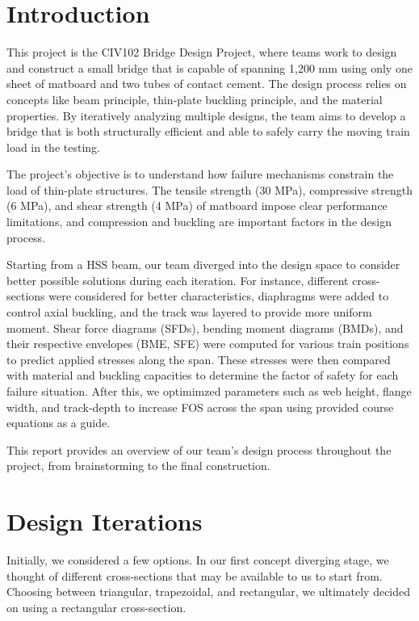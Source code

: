 \documentclass[prl,twocolumn,secnumarabic, amsmath,amssymb,superscriptaddress]{revtex4-2}
\begin{document}
\newpage
\twocolumngrid

\section{Introduction}
This project is the CIV102  Bridge Design Project, where teams work to design and construct a small bridge that is capable of spanning 1,200 mm using only one sheet of matboard and two tubes of contact cement. The design process relies on concepts like beam principle, thin-plate buckling principle, and the material properties. By iteratively analyzing multiple designs, the team aims to develop a bridge that is both structurally efficient and able to safely carry the moving train load in the testing.

The project's objective is to understand how failure mechanisms constrain the load of thin-plate structures. The tensile strength (30 MPa), compressive strength (6 MPa), and shear strength (4 MPa) of matboard impose clear performance limitations, and compression and buckling are important factors in the design process.

Starting from a HSS beam, our team diverged into the design space to consider better possible solutions during each iteration. For instance, different cross-sections were considered for better characteristics, diaphragms were added to control axial buckling, and the track was layered to provide more uniform moment. Shear force diagrams (SFDs), bending moment diagrams (BMDs), and their respective envelopes (BME, SFE) were computed for various train positions to predict applied stresses along the span. These stresses were then compared with material and buckling capacities to determine the factor of safety for each failure situation. After this, we optimimzed parameters such as web height, flange width, and track-depth to increase FOS across the span using provided course equations as a guide.

This report provides an overview of our team's design process throughout the project, from brainstorming to the final construction.


\section{Design Iterations}
Initially, we considered a few options. In our first concept diverging stage, we thought of different cross-sections that may be available to us to
start from. Choosing between triangular, trapezoidal, and rectangular, we ultimately decided on using a rectangular cross-section. \\
\end{document}

